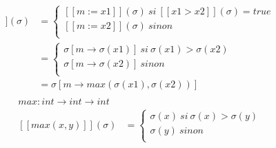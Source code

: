 \documentclass[11pt,a4paper]{article}
\begin{document}
	\begin{align*}
		[[if\ x1 > x2\ then\ m := x1 else\ m := x2]](\sigma) &=
		\begin{cases}
			[[m := x1]](\sigma)\ si\ [[x1 > x2]](\sigma) = true\\
			[[m := x2]](\sigma)\ sinon\\
		\end{cases}\\
		&=
		\begin{cases}
			\sigma[m \to \sigma(x1)]\ si\ \sigma(x1) > \sigma(x2)\\
			\sigma[m \to \sigma(x2)]\ sinon\\
		\end{cases}\\
		&= \sigma[m \to max(\sigma(x1), \sigma(x2))]\\
	\end{align*}
	\begin{align*}
		max : int \to int \to int&\\
		[[max(x,y)]](\sigma) &=
		\begin{cases}
			\sigma(x)\ si\ \sigma(x) > \sigma(y)\\
			\sigma(y)\ sinon\\
		\end{cases}
	\end{align*}
\end{document}
